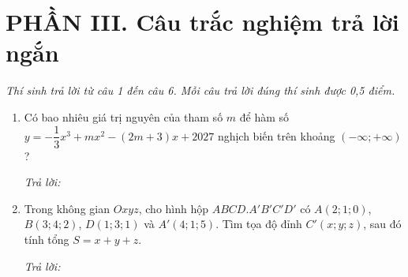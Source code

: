\documentclass[12pt,a4paper]{article}
\newcommand{\otraloi}{\par\nobreak\smallskip\noindent\textit{Trả lời:}\quad\fbox{\rule{0pt}{11pt}\makebox[0.3cm]{}}\,\fbox{\rule{0pt}{11pt}\makebox[0.3cm]{}}\,\fbox{\rule{0pt}{11pt}\makebox[0.3cm]{}}\,\fbox{\rule{0pt}{11pt}\makebox[0.3cm]{}}}
\begin{document}
\vspace{3pt}
\section*{\large PHẦN III. Câu trắc nghiệm trả lời ngắn}
\textit{Thí sinh trả lời từ câu 1 đến câu 6. Mỗi câu trả lời đúng thí sinh được 0,5 điểm.}
\begin{enumerate}
\item Có bao nhiêu giá trị nguyên của tham số $m$ để hàm số $y=-\dfrac{1}{3}x^3+mx^2-(2m+3)x+2027$ nghịch biến trên khoảng $(-\infty;+\infty)$?
\otraloi

\item Trong không gian $Oxyz$, cho hình hộp $ABCD.A'B'C'D'$ có $A(2;1;0)$, $B(3;4;2)$, $D(1;3;1)$ và $A'(4;1;5)$. Tìm tọa độ đỉnh $C'(x;y;z)$, sau đó tính tổng $S=x+y+z$.
\otraloi
\end{enumerate}
\end{document}
